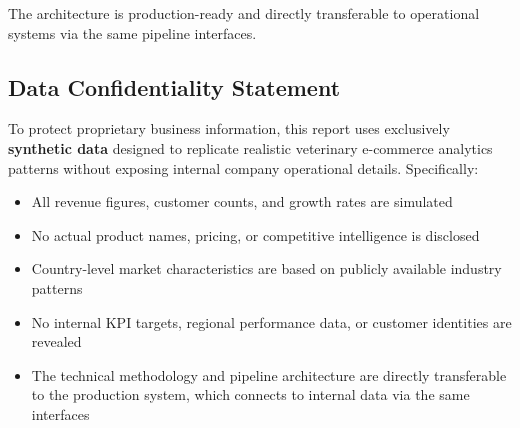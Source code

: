 \documentclass[11pt,a4paper]{article}
\begin{document}
The architecture is production-ready and directly transferable to operational systems via the same pipeline interfaces.

\subsection{Data Confidentiality Statement}

To protect proprietary business information, this report uses exclusively \textbf{synthetic data} designed to replicate realistic veterinary e-commerce analytics patterns without exposing internal company operational details. Specifically:
\begin{itemize}[leftmargin=*,noitemsep,topsep=2pt]
    \item All revenue figures, customer counts, and growth rates are simulated
    \item No actual product names, pricing, or competitive intelligence is disclosed
    \item Country-level market characteristics are based on publicly available industry patterns
    \item No internal KPI targets, regional performance data, or customer identities are revealed
    \item The technical methodology and pipeline architecture are directly transferable to the production system, which connects to internal data via the same interfaces
\end{itemize}
\end{document}
